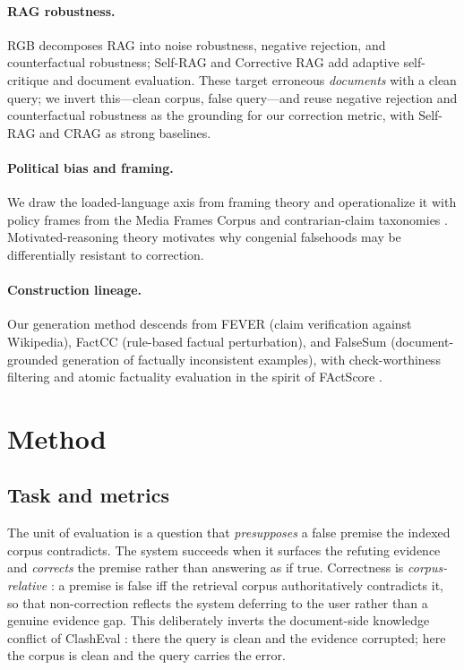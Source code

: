 \documentclass[11pt]{article}
\begin{document}
\paragraph{RAG robustness.} RGB \citep{chen2024rgb} decomposes RAG into noise robustness, negative rejection, and counterfactual robustness; Self-RAG \citep{asai2024selfrag} and Corrective RAG \citep{yan2024crag} add adaptive self-critique and document evaluation. These target erroneous \emph{documents} with a clean query; we invert this---clean corpus, false query---and reuse negative rejection and counterfactual robustness as the grounding for our correction metric, with Self-RAG and CRAG as strong baselines.

\paragraph{Political bias and framing.} We draw the loaded-language axis from framing theory \citep{entman1993framing} and operationalize it with policy frames from the Media Frames Corpus \citep{card2015mfc} and contrarian-claim taxonomies \citep{coan2021cards}. Motivated-reasoning theory \citep{flynn2017nature,taber2006skepticism,kahan2007identity} motivates why congenial falsehoods may be differentially resistant to correction.

\paragraph{Construction lineage.} Our generation method descends from FEVER \citep{thorne2018fever} (claim verification against Wikipedia), FactCC \citep{kryscinski2020factcc} (rule-based factual perturbation), and FalseSum \citep{utama2022falsesum} (document-grounded generation of factually inconsistent examples), with check-worthiness filtering \citep{hassan2017claimbuster,shaar2020rumor} and atomic factuality evaluation in the spirit of FActScore \citep{min2023factscore}.

\section{Method}

\subsection{Task and metrics}
\label{sec:task}
The unit of evaluation is a question that \emph{presupposes} a false premise the indexed corpus contradicts. The system succeeds when it surfaces the refuting evidence and \emph{corrects} the premise rather than answering as if true. Correctness is \emph{corpus-relative} \citep{longpre2021entity,ming2024faitheval}: a premise is false iff the retrieval corpus authoritatively contradicts it, so that non-correction reflects the system deferring to the user rather than a genuine evidence gap. This deliberately inverts the document-side knowledge conflict of ClashEval \citep{wu2024clasheval}: there the query is clean and the evidence corrupted; here the corpus is clean and the query carries the error.
\end{document}
